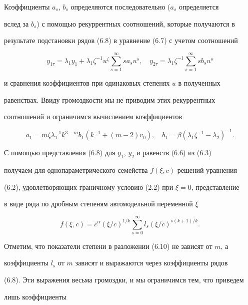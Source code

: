 Коэффициенты $a_s$, $b_s$ определяются последовательно ($a_s$ определяется 


вслед за $b_s$) с помощью рекуррентных соотношений, которые получаются в 


результате подстановки рядов (6.8) в уравнение (6.7) с учетом соотношений 


$$ 


y_{1\tau}=\lambda_1y_1+\lambda_1\zeta^{-1}u^\zeta 


\sum^\infty_{s=1}s a_s u^s,\quad 


y_{2\tau}=\lambda_1\zeta^{-1}\sum^\infty_{s=1}s b_s u^s 


$$ 


и сравнения коэффициентов при одинаковых степенях $u$ в полученных 


равенствах. Ввиду громоздкости мы не приводим этих рекуррентных 


соотношений и ограничимся вычислением коэффициентов 


\begin{equation} 


a_1=m\zeta\lambda_1^{-1}k^{3-m}b_1(k^{-1}+(m-2)v_0),\quad 


b_1=\beta(\lambda_1\zeta^{-1}-\lambda_2)^{-1}. 


\end{equation} 


С помощью представления (6.8) для $y_1$, $y_2$ и равенств (6.6) из (6.3) 


получаем для однопараметрического семейства $f(\xi,c)$ решений уравнения 


(6.2), удовлетворяющих граничному условию (2.2) при $\xi=0$, представление 


в виде ряда по дробным степеням автомодельной переменной $\xi$ 


\begin{equation} 


f(\xi,c)=c^\alpha(\xi/c)^{1/k}\sum^\infty_{s=0} 


l_s(\xi/c)^{s(k+1)/k}. 


\end{equation} 


Отметим, что показатели степени в разложении (6.10) не зависят от $m$, а


коэффициенты $l_s$ от $m$ зависят и выражаются через коэффициенты рядов 


(6.8). Эти выражения весьма громоздки, и мы ограничимся тем, что приведем 


лишь коэффициенты 


